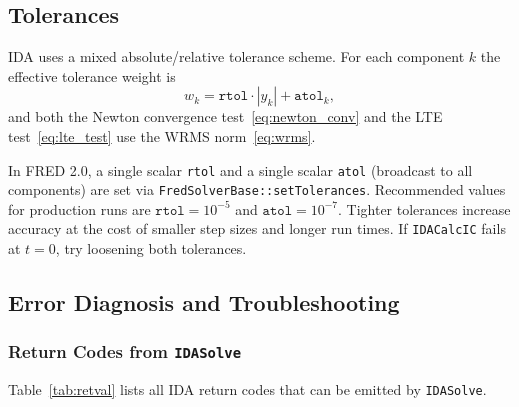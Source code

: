 \begin{refsection}
\subsection{Tolerances}
\label{sec:tolerances_fred2}

IDA uses a mixed absolute/relative tolerance scheme.  For each component $k$ the effective tolerance weight is
\begin{equation}
  w_k = \mathtt{rtol} \cdot |y_k| + \mathtt{atol}_k,
\end{equation}
and both the Newton convergence test~\eqref{eq:newton_conv} and the LTE test~\eqref{eq:lte_test} use the WRMS norm~\eqref{eq:wrms}.

In FRED 2.0, a single scalar \texttt{rtol} and a single scalar \texttt{atol} (broadcast to all components) are set via \texttt{FredSolverBase::setTolerances}.  Recommended values for production runs are $\mathtt{rtol} = 10^{-5}$ and $\mathtt{atol} = 10^{-7}$.  Tighter tolerances increase accuracy at the cost of smaller step sizes and longer run times. If \texttt{IDACalcIC} fails at $t = 0$, try loosening both tolerances.

\subsection{Error Diagnosis and Troubleshooting}
\label{sec:error_diagnosis}

\subsubsection{Return Codes from \texttt{IDASolve}}

Table~\ref{tab:retval} lists all IDA return codes that can be emitted by \texttt{IDASolve}.


\end{refsection}

